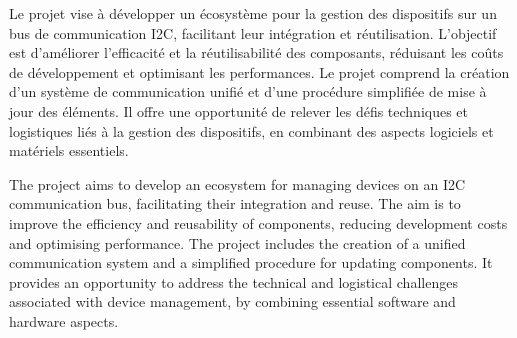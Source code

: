 Le projet vise à développer un écosystème pour la gestion des dispositifs sur un bus de communication I2C, facilitant leur intégration et réutilisation. L'objectif est d'améliorer l'efficacité et la réutilisabilité des composants, réduisant les coûts de développement et optimisant les performances. Le projet comprend la création d'un système de communication unifié et d'une procédure simplifiée de mise à jour des éléments. Il offre une opportunité de relever les défis techniques et logistiques liés à la gestion des dispositifs, en combinant des aspects logiciels et matériels essentiels.

\asterism

The project aims to develop an ecosystem for managing devices on an I2C communication bus, facilitating their integration and reuse. The aim is to improve the efficiency and reusability of components, reducing development costs and optimising performance. The project includes the creation of a unified communication system and a simplified procedure for updating components. It provides an opportunity to address the technical and logistical challenges associated with device management, by combining essential software and hardware aspects.


